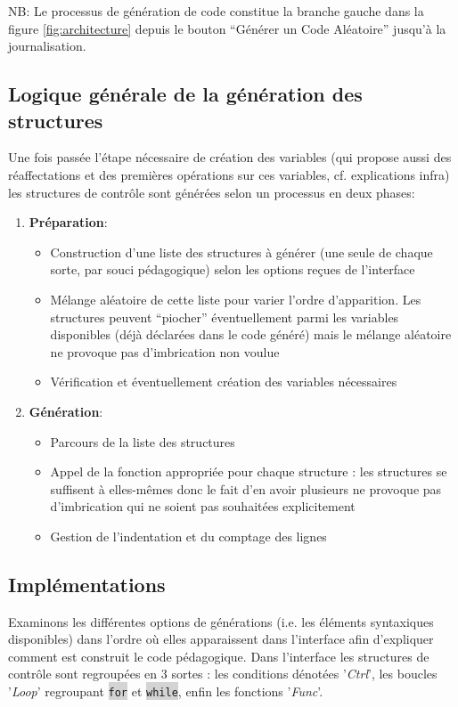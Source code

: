 \documentclass[11pt,a4paper]{article}
\newcommand{\code}[1]{\colorbox{lightgray}{\texttt{\small #1}}}
\newcommand{\var}[1]{\textit{#1}}
\begin{document}
NB: Le processus de génération de code constitue la branche gauche dans la figure \ref{fig:architecture} depuis le bouton ``Générer un Code Aléatoire'' jusqu'à la journalisation.

\subsection{Logique générale de la génération des structures}
Une fois passée l'étape nécessaire de création des variables (qui propose aussi des réaffectations et des premières opérations sur ces variables, cf. explications infra) les structures de contrôle sont générées selon un processus en deux phases:

\begin{enumerate}
    \item \textbf{Préparation}:
    \begin{itemize}
        \item Construction d'une liste des structures à générer (une seule de chaque sorte, par souci pédagogique) selon les options reçues de l'interface
        \item Mélange aléatoire de cette liste pour varier l'ordre d'apparition. Les structures peuvent ``piocher'' éventuellement parmi les variables disponibles (déjà déclarées dans le code généré) mais le mélange aléatoire ne provoque pas d'imbrication non voulue 
        \item Vérification et éventuellement création des variables nécessaires
    \end{itemize}
    
    \item \textbf{Génération}:
    \begin{itemize}
        \item Parcours de la liste des structures
        \item Appel de la fonction appropriée pour chaque structure : les structures se suffisent à elles-mêmes donc le fait d'en avoir plusieurs ne provoque pas d'imbrication qui ne soient pas souhaitées explicitement
        \item Gestion de l'indentation et du comptage des lignes
    \end{itemize}
\end{enumerate}

\subsection{Implémentations}
Examinons les différentes options de générations (i.e. les éléments syntaxiques disponibles) dans l'ordre où elles apparaissent dans l'interface afin d'expliquer comment est construit le code pédagogique. Dans l'interface les structures de contrôle sont regroupées en 3 sortes : les conditions dénotées '\var{Ctrl}', les boucles '\var{Loop}' regroupant \code{for} et \code{while}, enfin les fonctions '\var{Func}'.
\end{document}
